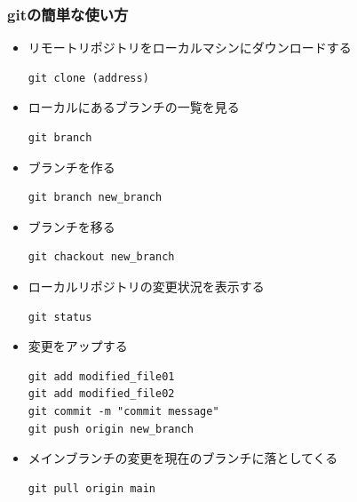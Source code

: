 \subsubsection{gitの簡単な使い方}
\begin{itemize}
    \item リモートリポジトリをローカルマシンにダウンロードする
    \begin{lstlisting}
git clone (address)
    \end{lstlisting}
    \item ローカルにあるブランチの一覧を見る
    \begin{lstlisting}
git branch
    \end{lstlisting}
    \item ブランチを作る
    \begin{lstlisting}
git branch new_branch
    \end{lstlisting}
    \item ブランチを移る
    \begin{lstlisting}
git chackout new_branch
    \end{lstlisting}
    \item ローカルリポジトリの変更状況を表示する
    \begin{lstlisting}
git status
    \end{lstlisting}
    \item 変更をアップする
    \begin{lstlisting}
git add modified_file01
git add modified_file02
git commit -m "commit message"
git push origin new_branch
    \end{lstlisting}
    \item メインブランチの変更を現在のブランチに落としてくる
    \begin{lstlisting}
git pull origin main
    \end{lstlisting}
\end{itemize}